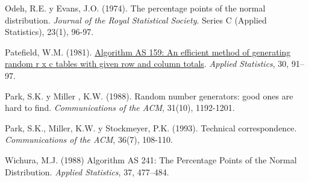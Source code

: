\documentclass[
]{book}
\theoremstyle{break}
\theoremstyle{nonumberplain}
\begin{document}
Odeh, R.E. y Evans, J.O. (1974). The percentage points of the normal distribution. \emph{Journal of the Royal Statistical Society}. Series C (Applied Statistics), 23(1), 96-97.

Patefield, W.M. (1981). \href{https://doi.org/10.2307/2346669}{Algorithm AS 159: An efficient method of generating random r x c tables with given row and column totals}. \emph{Applied Statistics}, 30, 91--97.

Park, S.K. y Miller , K.W. (1988). Random number generators: good ones are hard to find. \emph{Communications of the ACM}, 31(10), 1192-1201.

Park, S.K., Miller, K.W. y Stockmeyer, P.K. (1993). Technical correspondence. \emph{Communications of the ACM}, 36(7), 108-110.

Wichura, M.J. (1988) Algorithm AS 241: The Percentage Points of the Normal Distribution. \emph{Applied Statistics}, 37, 477--484.

  
\end{document}
